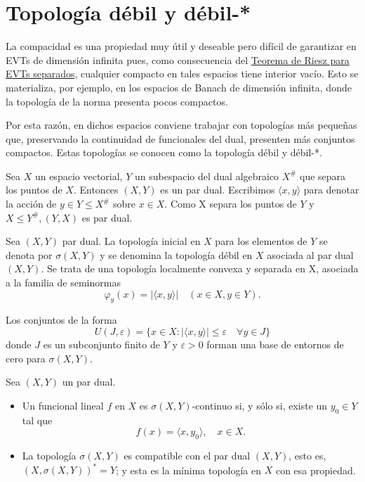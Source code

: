\section{Topología débil y débil-*}

La compacidad es una propiedad muy útil y deseable pero difícil de garantizar en EVTs de dimensión infinita pues, como consecuencia del \hyperref[thm:d04]{Teorema de Riesz para EVTs separados}, cualquier compacto en tales espacios tiene interior vacío. Esto se materializa, por ejemplo, en los espacios de Banach de dimensión infinita, donde la topología de la norma presenta pocos compactos.

Por esta razón, en dichos espacios conviene trabajar con topologías más pequeñas que, preservando la continuidad de funcionales del dual, presenten más conjuntos compactos. Estas topologías se conocen como la topología débil y débil-*.

\begin{definicion}
Sea $X$ un espacio vectorial, $Y$ un subespacio del dual algebraico $X^{\#}$ que separa los puntos de $X$. Entonces $(X,Y)$ es un par dual. Escribimos $\langle x,y\rangle$ para denotar la acción de $y\in Y \leq X^{\#}$ sobre $x\in X$. Como X separa los puntos de $Y$ y $X\leq Y^{\#}, (Y,X)$ es par dual.
\end{definicion}

\begin{definicion}
Sea $(X,Y)$ par dual. La topología inicial en $X$ para los elementos de $Y$ se denota por $\sigma(X,Y)$ y se denomina la topología débil en $X$ asociada al par dual $(X,Y)$. Se trata de una topología localmente convexa y separada en X, asociada a la familia de seminormas 
$$\varphi_{y}(x) = \vert\langle x,y\rangle\vert  \quad (x\in X, y\in Y).$$

Los conjuntos de la forma 
$$U(J,\varepsilon) = \{ x\in X :  \vert\langle x,y\rangle\vert \leq \varepsilon \quad \forall y\in J\}$$
donde $J$ es un subconjunto finito de $Y$ y $\varepsilon > 0$ forman una base de entornos de cero para  $\sigma(X,Y)$.
\end{definicion}

\begin{proposicion}

Sea $(X,Y)$ un par dual.
\begin{itemize}
	\item Un funcional lineal $f$ en $X$ es $\sigma (X,Y)$-continuo si, y sólo si, existe un $y_{0}\in Y$ tal que
	$$f(x) = \langle x,y_{0}\rangle, \quad x\in X.$$
	\item La topología $\sigma (X,Y)$ es compatible con el par dual $(X,Y)$, esto es, $(X,\sigma (X,Y))^{*} = Y$; y esta es la mínima topología en $X$ con esa propiedad.
\end{itemize}
\end{proposicion}

